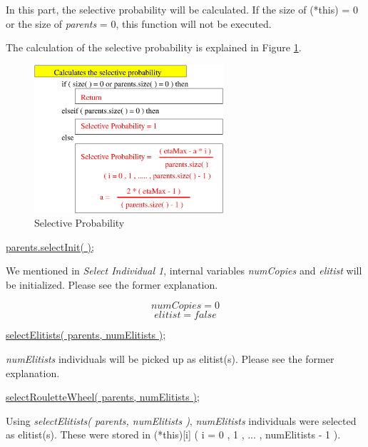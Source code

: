 \documentclass[twocolumn]{article}
\begin{document}
\noindent
In this part, the selective probability will be calculated. If
the size of (*this) = 0 or the size of {\em parents} = 0, this
function will not be executed.

\noindent
The calculation of the selective probability is explained in Figure \ref{SelectLinear}.

\begin{figure}[h]
\begin{center}
\includegraphics[width=7cm]{selectLinear1.eps}
\caption{Selective Probability}
\label{SelectLinear}
\end{center}
\end{figure}

\vspace*{2mm}

\noindent
\underline{parents.selectInit( );}

\noindent
We mentioned in {\em Select Individual 1}, internal variables {\em numCopies} and {\em
elitist} will be initialized. Please see the former explanation.

\begin{equation}
numCopies = 0
\end{equation}
\begin{equation}
elitist = false
\end{equation}

\vspace*{2mm}

\noindent
\underline{selectElitists( parents, numElitists );}

\noindent
{\em numElitists} individuals will be picked up as elitist(s). Please
see the former explanation.

\vspace*{2mm}

\noindent
\underline{selectRouletteWheel( parents, numElitists );}

\noindent
Using {\em selectElitists( parents, numElitists )}, {\em numElitists}
individuals were selected as elitist(s). These were stored in
(*this)[i] ( i = 0 , 1 , ... , numElitists - 1 ).
\end{document}
